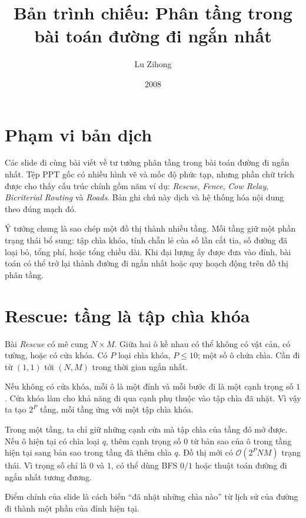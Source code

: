 \documentclass[11pt]{article}
\title{Bản trình chiếu: Phân tầng trong bài toán đường đi ngắn nhất}
\author{Lu Zihong}
\date{2008}
\newcommand{\Oh}{\mathcal{O}}
\begin{document}
\maketitle


\section{Phạm vi bản dịch}

Các slide đi cùng bài viết về tư tưởng phân tầng trong bài toán đường đi ngắn
nhất. Tệp PPT gốc có nhiều hình vẽ và mốc độ phức tạp, nhưng phần chữ trích
được cho thấy cấu trúc chính gồm năm ví dụ: \textit{Rescue}, \textit{Fence},
\textit{Cow Relay}, \textit{Bicriterial Routing} và \textit{Roads}. Bản ghi
chú này dịch và hệ thống hóa nội dung theo đúng mạch đó.

Ý tưởng chung là sao chép một đồ thị thành nhiều tầng. Mỗi tầng giữ một phần
trạng thái bổ sung: tập chìa khóa, tính chẵn lẻ của số lần cắt tia, số đường
đã loại bỏ, tổng phí, hoặc tổng chiều dài. Khi đại lượng ấy được đưa vào đỉnh,
bài toán có thể trở lại thành đường đi ngắn nhất hoặc quy hoạch động trên đồ
thị phân tầng.

\section{Rescue: tầng là tập chìa khóa}

Bài \textit{Rescue} có mê cung \(N\times M\). Giữa hai ô kề nhau có thể không
có vật cản, có tường, hoặc có cửa khóa. Có \(P\) loại chìa khóa, \(P\le 10\);
một số ô chứa chìa. Cần đi từ \((1,1)\) tới \((N,M)\) trong thời gian ngắn
nhất.

Nếu không có cửa khóa, mỗi ô là một đỉnh và mỗi bước đi là một cạnh trọng số
\(1\). Cửa khóa làm cho khả năng đi qua cạnh phụ thuộc vào tập chìa đã nhặt.
Vì vậy ta tạo \(2^P\) tầng, mỗi tầng ứng với một tập chìa khóa.

Trong một tầng, ta chỉ giữ những cạnh cửa mà tập chìa của tầng đó mở được.
Nếu ô hiện tại có chìa loại \(q\), thêm cạnh trọng số \(0\) từ bản sao của ô
trong tầng hiện tại sang bản sao trong tầng đã thêm chìa \(q\). Đồ thị mới có
\(\Oh(2^P NM)\) trạng thái. Vì trọng số chỉ là \(0\) và \(1\), có thể dùng
BFS \(0/1\) hoặc thuật toán đường đi ngắn nhất tương đương.

Điểm chính của slide là cách biến ``đã nhặt những chìa nào'' từ lịch sử của
đường đi thành một phần của đỉnh hiện tại.
\end{document}
